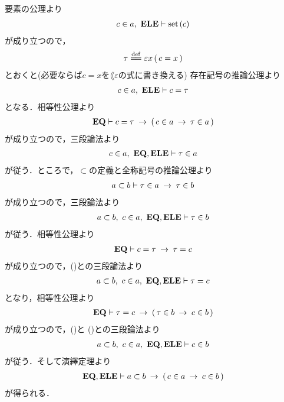 	\begin{prf}	
		要素の公理より
		\begin{align}
			c \in a,\ \mbox{{\bf ELE}} \vdash \operatorname*{set}\hspace{0.15em}(c)
		\end{align}
		が成り立つので，
		\begin{align}
			\tau \defeq \varepsilon x\, (\, c=x\, )
		\end{align}
		とおくと(必要ならば$c = x$を$\lang{\varepsilon}$の式に書き換える)
		存在記号の推論公理より
		\begin{align}
			c \in a,\ \mbox{{\bf ELE}} \vdash c = \tau
			\label{fom:subclass_contains_all_elements_1}
		\end{align}
		となる．相等性公理より
		\begin{align}
			\mbox{{\bf EQ}} \vdash c = \tau \hspace{0.25em}\rightarrow\hspace{0.25em} (\, c \in a \hspace{0.25em}\rightarrow\hspace{0.25em} \tau \in a\, )
		\end{align}
		が成り立つので，三段論法より
		\begin{align}
			c \in a,\ \mbox{{\bf EQ}},\mbox{{\bf ELE}} \vdash \tau \in a
		\end{align}
		が従う．ところで，$\subset$の定義と全称記号の推論公理より
		\begin{align}
			a \subset b \vdash \tau \in a \hspace{0.25em}\rightarrow\hspace{0.25em} \tau \in b
		\end{align}
		が成り立つので，三段論法より
		\begin{align}
			a \subset b,\ c \in a,\ \mbox{{\bf EQ}},\mbox{{\bf ELE}} \vdash \tau \in b
			\label{fom:subclass_contains_all_elements_2}
		\end{align}
		が従う．相等性公理より
		\begin{align}
			\mbox{{\bf EQ}} \vdash c = \tau \hspace{0.25em}\rightarrow\hspace{0.25em} \tau = c
		\end{align}
		が成り立つので，()との三段論法より
		\begin{align}
			a \subset b,\ c \in a,\ \mbox{{\bf EQ}},\mbox{{\bf ELE}} \vdash \tau = c
			\label{fom:subclass_contains_all_elements_3}
		\end{align}
		となり，相等性公理より
		\begin{align}
			\mbox{{\bf EQ}} \vdash \tau = c \hspace{0.25em}\rightarrow\hspace{0.25em} (\, \tau \in b \hspace{0.25em}\rightarrow\hspace{0.25em} c \in b\, )
		\end{align}
		が成り立つので，()と
		()との三段論法より
		\begin{align}
			a \subset b,\ c \in a,\ \mbox{{\bf EQ}},\mbox{{\bf ELE}} \vdash c \in b
		\end{align}
		が従う．そして演繹定理より
		\begin{align}
			\mbox{{\bf EQ}},\mbox{{\bf ELE}} \vdash 
			a \subset b \hspace{0.25em}\rightarrow\hspace{0.25em} (\, c \in a \hspace{0.25em}\rightarrow\hspace{0.25em} c \in b\, )
		\end{align}
		が得られる．
		\QED
	\end{prf}
	

